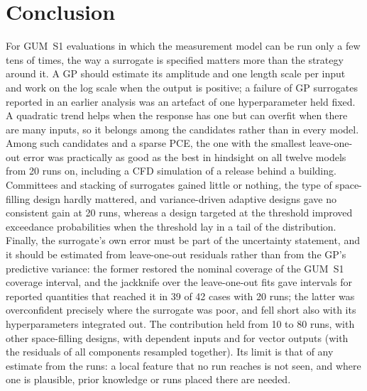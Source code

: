 
\section{Conclusion}
\label{sec:conclusion}
For GUM~S1 evaluations in which the measurement model can be run only a few
tens of times, the way a surrogate is specified matters more than the
strategy around it. A GP should estimate its amplitude and one length scale
per input and work on the log scale when the output is positive; a failure
of GP surrogates reported in an earlier analysis was an artefact of one
hyperparameter held fixed. A quadratic trend helps when the response has
one but can overfit when there are many inputs, so it belongs among the
candidates rather than in every model. Among such candidates and a sparse
PCE, the one with the smallest leave-one-out error
was practically as good as the best in hindsight on all twelve models from
20 runs on,
including a CFD simulation of a release behind a building. Committees and
stacking of surrogates gained little or nothing, the type of space-filling
design hardly mattered, and variance-driven adaptive designs gave no
consistent gain at 20 runs,
whereas a design targeted at the threshold improved exceedance
probabilities when the threshold lay in a tail of the distribution. Finally, the surrogate's own error must be part of the
uncertainty statement, and it should be estimated from leave-one-out
residuals rather than from the GP's predictive variance: the former
restored the nominal coverage of the GUM~S1 coverage interval, and the
jackknife over the leave-one-out fits gave intervals for reported
quantities that reached it in 39 of 42 cases with 20 runs; the latter was
overconfident precisely where the surrogate was poor, and fell short also
with its hyperparameters integrated out. The contribution held from 10 to
80 runs, with other space-filling designs, with dependent inputs and for
vector outputs (with the residuals of all components resampled together).
Its limit is that of any estimate from the runs: a
local feature that no run reaches is not seen, and where one is plausible,
prior knowledge or runs placed there are needed.
